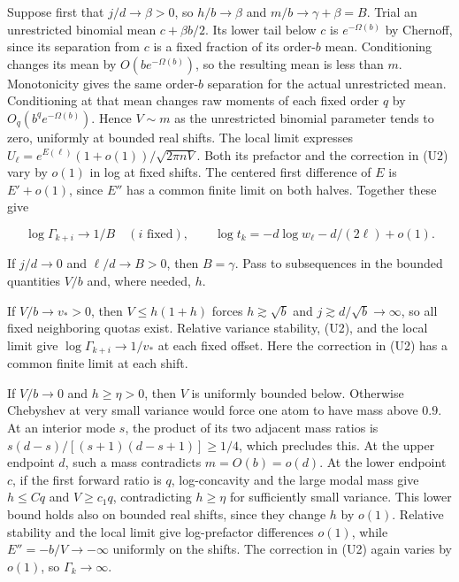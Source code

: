 Suppose first that $j/d\to\beta>0$, so $h/b\to\beta$ and $m/b\to\gamma+\beta=B$. Trial an unrestricted binomial mean $c+\beta b/2$. Its lower tail below $c$ is $e^{-\Omega(b)}$ by Chernoff, since its separation from $c$ is a fixed fraction of its order-$b$ mean. Conditioning changes its mean by $O(be^{-\Omega(b)})$, so the resulting mean is less than $m$. Monotonicity gives the same order-$b$ separation for the actual unrestricted mean. Conditioning at that mean changes raw moments of each fixed order $q$ by $O_q(b^qe^{-\Omega(b)})$. Hence $V\sim m$ as the unrestricted binomial parameter tends to zero, uniformly at bounded real shifts. The local limit expresses $U_\ell=e^{E(\ell)}(1+o(1))/\sqrt{2\pi nV}$. Both its prefactor and the correction in (U2) vary by $o(1)$ in log at fixed shifts. The centered first difference of $E$ is $E'+o(1)$, since $E''$ has a common finite limit on both halves. Together these give

\begin{equation}
\log\Gamma_{k+i}\longrightarrow 1/B\quad(i\text{ fixed}),\qquad
\log t_k=-d\log w_\ell-d/(2\ell)+o(1).
\tag{U3}
\end{equation}

If $j/d\to0$ and $\ell/d\to B>0$, then $B=\gamma$. Pass to subsequences in the bounded quantities $V/b$ and, where needed, $h$.

If $V/b\to v_*>0$, then $V\le h(1+h)$ forces $h\gtrsim\sqrt b$ and $j\gtrsim d/\sqrt b\to\infty$, so all fixed neighboring quotas exist. Relative variance stability, (U2), and the local limit give $\log\Gamma_{k+i}\to1/v_*$ at each fixed offset. Here the correction in (U2) has a common finite limit at each shift.

If $V/b\to0$ and $h\ge\eta>0$, then $V$ is uniformly bounded below. Otherwise Chebyshev at very small variance would force one atom to have mass above $0.9$. At an interior mode $s$, the product of its two adjacent mass ratios is $s(d-s)/[(s+1)(d-s+1)]\ge1/4$, which precludes this. At the upper endpoint $d$, such a mass contradicts $m=O(b)=o(d)$. At the lower endpoint $c$, if the first forward ratio is $q$, log-concavity and the large modal mass give $h\le Cq$ and $V\ge c_1q$, contradicting $h\ge\eta$ for sufficiently small variance. This lower bound holds also on bounded real shifts, since they change $h$ by $o(1)$. Relative stability and the local limit give log-prefactor differences $o(1)$, while $E''=-b/V\to-\infty$ uniformly on the shifts. The correction in (U2) again varies by $o(1)$, so $\Gamma_k\to\infty$.

